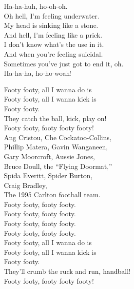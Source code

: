 Ha-ha-huh, ho-oh-oh. \\

Oh hell, I'm feeling underwater. \\
My head is sinking like a stone. \\
And hell, I'm feeling like a prick. \\
I don't know what's the use in it. \\
And when you're feeling suicidal. \\
Sometimes you've just got to end it, oh. \\

Ha-ha-ha, ho-ho-woah! \\




Footy footy, all I wanna do is \\
Footy footy, all I wanna kick is \\
Footy footy. \\
They catch the ball, kick, play on! \\
Footy footy, footy footy footy! \\

Ang Cristou, Che Cockatoo-Collins, \\
Phillip Matera, Gavin Wanganeen, \\
Gary Moorcroft, Aussie Jones, \\
Bruce Doull, the ``Flying Doormat,'' \\
Spida Everitt, Spider Burton, \\
Craig Bradley, \\
The 1995 Carlton football team. \\

Footy footy, footy footy. \\
Footy footy, footy footy. \\
Footy footy, footy footy. \\
Footy footy, footy footy. \\

Footy footy, all I wanna do is \\
Footy footy, all I wanna kick is \\
Footy footy. \\
They’ll crumb the ruck and run, handball! \\
Footy footy, footy footy footy! \\

